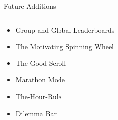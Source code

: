 \documentclass{beamer}
\begin{document}
	\begin{frame}{Future Additions}
	\begin{columns}
        \begin{column}{0.7\textwidth} %
        \begin{itemize}

		\item Group and Global Leaderboards
        \item The Motivating Spinning Wheel
        \item The Good Scroll
        \item Marathon Mode
        \item The-Hour-Rule
		\item Dilemma Bar

	\end{itemize}

    \end{column}
        
    \begin{column}{0.3\textwidth} %
        \end{column}
	\end{columns}
	\end{frame}
\end{document}

